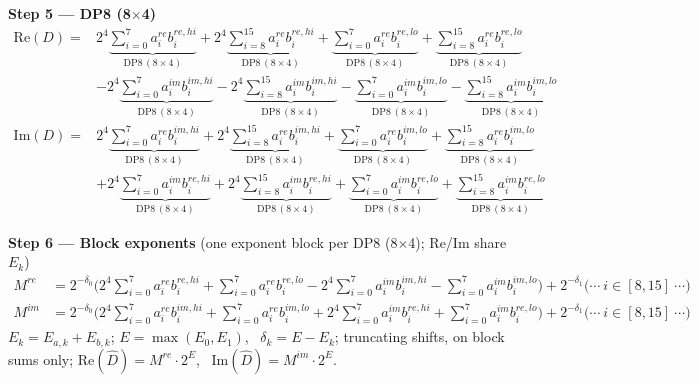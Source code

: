 \documentclass[fleqn]{article}
\newcommand{\DPop}[3]{\mathrm{DP#1}\,(#2\!\times\!#3)}
\begin{document}
\textbf{Step 5 --- DP8 (8$\times$4)}
\begin{align*}
\mathrm{Re}(D) = {}
  & 2^{4} \underbrace{\sum_{i=0}^{7} a_i^{re} b_i^{re,hi}}_{\DPop{8}{8}{4}}
  + 2^{4} \underbrace{\sum_{i=8}^{15} a_i^{re} b_i^{re,hi}}_{\DPop{8}{8}{4}}
  + \underbrace{\sum_{i=0}^{7} a_i^{re} b_i^{re,lo}}_{\DPop{8}{8}{4}}
  + \underbrace{\sum_{i=8}^{15} a_i^{re} b_i^{re,lo}}_{\DPop{8}{8}{4}} \\[0.3em]
  & - 2^{4} \underbrace{\sum_{i=0}^{7} a_i^{im} b_i^{im,hi}}_{\DPop{8}{8}{4}}
  - 2^{4} \underbrace{\sum_{i=8}^{15} a_i^{im} b_i^{im,hi}}_{\DPop{8}{8}{4}}
  - \underbrace{\sum_{i=0}^{7} a_i^{im} b_i^{im,lo}}_{\DPop{8}{8}{4}}
  - \underbrace{\sum_{i=8}^{15} a_i^{im} b_i^{im,lo}}_{\DPop{8}{8}{4}}
\end{align*}
\begin{align*}
\mathrm{Im}(D) = {}
  & 2^{4} \underbrace{\sum_{i=0}^{7} a_i^{re} b_i^{im,hi}}_{\DPop{8}{8}{4}}
  + 2^{4} \underbrace{\sum_{i=8}^{15} a_i^{re} b_i^{im,hi}}_{\DPop{8}{8}{4}}
  + \underbrace{\sum_{i=0}^{7} a_i^{re} b_i^{im,lo}}_{\DPop{8}{8}{4}}
  + \underbrace{\sum_{i=8}^{15} a_i^{re} b_i^{im,lo}}_{\DPop{8}{8}{4}} \\[0.3em]
  & + 2^{4} \underbrace{\sum_{i=0}^{7} a_i^{im} b_i^{re,hi}}_{\DPop{8}{8}{4}}
  + 2^{4} \underbrace{\sum_{i=8}^{15} a_i^{im} b_i^{re,hi}}_{\DPop{8}{8}{4}}
  + \underbrace{\sum_{i=0}^{7} a_i^{im} b_i^{re,lo}}_{\DPop{8}{8}{4}}
  + \underbrace{\sum_{i=8}^{15} a_i^{im} b_i^{re,lo}}_{\DPop{8}{8}{4}}
\end{align*}

\textbf{Step 6 --- Block exponents}\quad
{\small(one exponent block per DP8 (8$\times$4); $\mathrm{Re}$/$\mathrm{Im}$ share $E_k$)}
\begin{align*}
M^{re} &= 2^{-\delta_0}\Big(2^{4}\!\sum_{i=0}^{7} a_i^{re} b_i^{re,hi} + \sum_{i=0}^{7} a_i^{re} b_i^{re,lo} - 2^{4}\!\sum_{i=0}^{7} a_i^{im} b_i^{im,hi} - \sum_{i=0}^{7} a_i^{im} b_i^{im,lo}\Big) + 2^{-\delta_1}\Big(\cdots\ i\!\in\![8,15]\ \cdots\Big) \\[0.15em]
M^{im} &= 2^{-\delta_0}\Big(2^{4}\!\sum_{i=0}^{7} a_i^{re} b_i^{im,hi} + \sum_{i=0}^{7} a_i^{re} b_i^{im,lo} + 2^{4}\!\sum_{i=0}^{7} a_i^{im} b_i^{re,hi} + \sum_{i=0}^{7} a_i^{im} b_i^{re,lo}\Big) + 2^{-\delta_1}\Big(\cdots\ i\!\in\![8,15]\ \cdots\Big)
\end{align*}
$E_k=E_{a,k}+E_{b,k}$; \quad $E=\max(E_0,E_1)$, \ $\delta_k=E-E_k$; \quad truncating shifts, on block sums only; \quad $\mathrm{Re}(\hat D)=M^{re}\cdot2^{E}$, \ $\mathrm{Im}(\hat D)=M^{im}\cdot2^{E}$.
\end{document}
